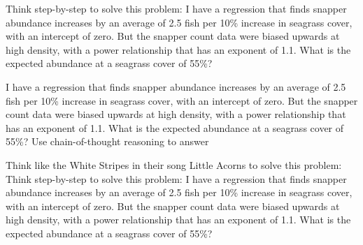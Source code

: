 \documentclass[
  letterpaper,
  DIV=11,
  numbers=noendperiod]{scrreprt}
\begin{document}
\begin{tcolorbox}[enhanced jigsaw, coltitle=black, breakable, toptitle=1mm, titlerule=0mm, bottomtitle=1mm, colframe=quarto-callout-note-color-frame, left=2mm, leftrule=.75mm, title=\textcolor{quarto-callout-note-color}{\faInfo}\hspace{0.5em}{Note}, opacityback=0, colback=white, opacitybacktitle=0.6, bottomrule=.15mm, arc=.35mm, rightrule=.15mm, toprule=.15mm, colbacktitle=quarto-callout-note-color!10!white]

Think step-by-step to solve this problem: I have a regression that finds
snapper abundance increases by an average of 2.5 fish per 10\% increase
in seagrass cover, with an intercept of zero. But the snapper count data
were biased upwards at high density, with a power relationship that has
an exponent of 1.1. What is the expected abundance at a seagrass cover
of 55\%?

\end{tcolorbox}

\begin{tcolorbox}[enhanced jigsaw, coltitle=black, breakable, toptitle=1mm, titlerule=0mm, bottomtitle=1mm, colframe=quarto-callout-note-color-frame, left=2mm, leftrule=.75mm, title=\textcolor{quarto-callout-note-color}{\faInfo}\hspace{0.5em}{Note}, opacityback=0, colback=white, opacitybacktitle=0.6, bottomrule=.15mm, arc=.35mm, rightrule=.15mm, toprule=.15mm, colbacktitle=quarto-callout-note-color!10!white]

I have a regression that finds snapper abundance increases by an average
of 2.5 fish per 10\% increase in seagrass cover, with an intercept of
zero. But the snapper count data were biased upwards at high density,
with a power relationship that has an exponent of 1.1. What is the
expected abundance at a seagrass cover of 55\%? Use chain-of-thought
reasoning to answer

\end{tcolorbox}

\begin{tcolorbox}[enhanced jigsaw, coltitle=black, breakable, toptitle=1mm, titlerule=0mm, bottomtitle=1mm, colframe=quarto-callout-note-color-frame, left=2mm, leftrule=.75mm, title=\textcolor{quarto-callout-note-color}{\faInfo}\hspace{0.5em}{Note}, opacityback=0, colback=white, opacitybacktitle=0.6, bottomrule=.15mm, arc=.35mm, rightrule=.15mm, toprule=.15mm, colbacktitle=quarto-callout-note-color!10!white]

Think like the White Stripes in their song Little Acorns to solve this
problem: Think step-by-step to solve this problem: I have a regression
that finds snapper abundance increases by an average of 2.5 fish per
10\% increase in seagrass cover, with an intercept of zero. But the
snapper count data were biased upwards at high density, with a power
relationship that has an exponent of 1.1. What is the expected abundance
at a seagrass cover of 55\%?

\end{tcolorbox}
\end{document}

